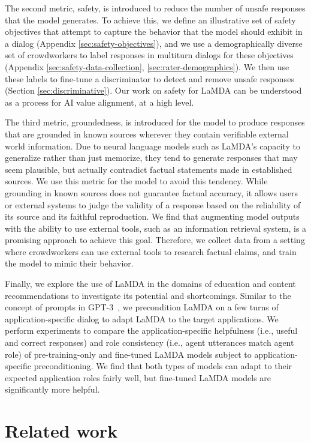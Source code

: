 \documentclass{article}
\def\knowledgetool{information retrieval system\xspace}
\def\factualitymetric{groundedness\xspace}
\begin{document}
The second metric, safety, is introduced to reduce the number of unsafe responses that the model generates. To achieve this, we define an illustrative set of safety objectives that attempt to capture the behavior that the model should exhibit in a dialog (Appendix \ref{sec:safety-objectives}), and we use a demographically diverse set of crowdworkers to label responses in multiturn dialogs for these objectives (Appendix \ref{sec:safety-data-collection}, \ref{sec:rater-demographics}). We then use these labels to fine-tune a discriminator to detect and remove unsafe responses (Section \ref{sec:discriminative}). Our work on safety for LaMDA can be understood as a process for AI value alignment, at a high level.

The third metric, \factualitymetric, is introduced for the model to produce responses that are grounded in known sources wherever they contain verifiable external world information. Due to neural language models such as LaMDA's capacity to generalize rather than just memorize, they tend to generate responses that may seem plausible, but actually contradict factual statements made in established sources. We use this metric for the model to avoid this tendency. While grounding in known sources does not guarantee factual accuracy, it allows users or external systems to judge the validity of a response based on the reliability of its source and its faithful reproduction. We find that augmenting model outputs with the ability to use external tools, such as an \knowledgetool, is a promising approach to achieve this goal. Therefore, we collect data from a setting where crowdworkers can use external tools to research factual claims, and train the model to mimic their behavior.

Finally, we explore the use of LaMDA in the domains of education and content recommendations to investigate its potential and shortcomings. Similar to the concept of prompts in GPT-3~\cite{gpt320}, we precondition LaMDA on a few turns of application-specific dialog to adapt LaMDA to the target applications. We perform experiments to compare the application-specific helpfulness (i.e., useful and correct responses) and role consistency (i.e., agent utterances match agent role) of pre-training-only and fine-tuned LaMDA models subject to application-specific preconditioning. We find that both types of models can adapt to their expected application roles fairly well, but fine-tuned LaMDA models are significantly more helpful.

\section{Related work}
\label{sec:related-work}
\end{document}
